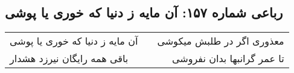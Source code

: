 \begin{center}
\section*{رباعی شماره ۱۵۷: آن مایه ز دنیا که خوری یا پوشی}
\label{sec:sh157}
\begin{longtable}{l p{0.5cm} r}
آن مایه ز دنیا که خوری یا پوشی
&&
معذوری اگر در طلبش میکوشی
\\
باقی همه رایگان نیرزد هشدار
&&
تا عمر گرانبها بدان نفروشی
\\
\end{longtable}
\end{center}
